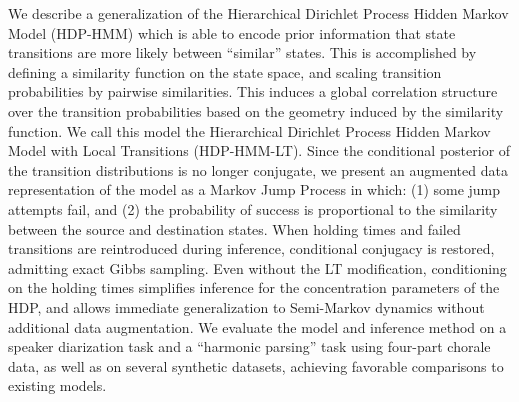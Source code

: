 We describe a generalization of the Hierarchical Dirichlet Process Hidden Markov Model (HDP-HMM) which is able to encode prior information that state transitions are more likely between ``similar'' states.  This is accomplished by defining a similarity function on the state space, and scaling transition probabilities by pairwise similarities. This induces a global correlation structure over the transition probabilities based on the geometry induced by the similarity function.  We call this model the Hierarchical Dirichlet Process Hidden Markov Model with Local Transitions (HDP-HMM-LT). Since the conditional posterior of the transition distributions is no longer conjugate, we present an augmented data representation of the model as a Markov Jump Process in which: (1) some jump attempts fail, and (2) the probability of success is proportional to the similarity between the source and destination states. When holding times and failed transitions are reintroduced during inference, conditional conjugacy is restored, admitting exact Gibbs sampling.  Even without the LT modification, conditioning on the holding times simplifies inference for the concentration parameters of the HDP, and allows immediate generalization to Semi-Markov dynamics without additional data augmentation.  We evaluate the model and inference method on a speaker diarization task and a ``harmonic parsing'' task using four-part chorale data, as well as on several synthetic datasets, achieving favorable comparisons to existing models.
